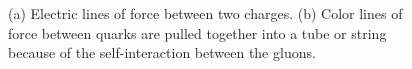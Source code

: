 \begin{figure}[htbm!]
 \centering
{}
\caption{(a) Electric lines of force between two charges. (b) Color lines of force between quarks are pulled together into a tube or string because of the self-interaction between the gluons.}
\label{fig:StringFragmentation}
\end{figure}

